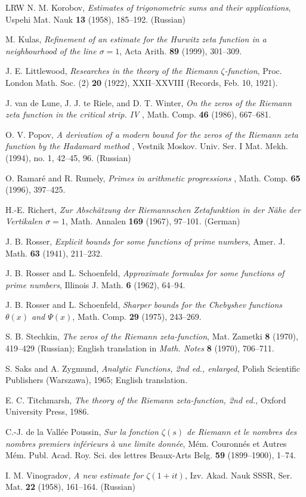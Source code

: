 \documentclass[10pt]{amsart}
\theoremstyle{remark}
\theoremstyle{plain}
\numberwithin{equation}{section}
\theoremstyle{definition}
\begin{document}
\begin{thebibliography}{LRW}
  N. M. Korobov, {\it Estimates of trigonometric sums and 
their applications}, Uspehi Mat. Nauk {\bf 13} (1958),  185--192. (Russian)

  M. Kulas, {\it Refinement of an estimate for the Hurwitz zeta
function in a neighbourhood of the line $\sigma=1$}, Acta Arith. 
{\bf 89} (1999),  301--309.

  J. E. Littlewood, {\it Researches in the theory of the
Riemann $\zeta$-function}, Proc. London Math. Soc. (2) {\bf 20} (1922),
 XXII--XXVIII (Records, Feb. 10, 1921).

  J. van de Lune, J. J. te Riele, and D. T. Winter, {\it
On the zeros of the Riemann zeta function in the critical strip. IV
}, Math. Comp. {\bf 46} (1986),  667--681.

  O. V. Popov, {\it A derivation of a modern bound for the
zeros of the Riemann zeta function by the Hadamard method }, Vestnik 
Moskov. Univ. Ser. I Mat. Mekh.  (1994), no. 1, 42--45, 96.
(Russian)

  O. Ramar\'e and R. Rumely, {\it Primes in arithmetic
progressions }, Math. Comp. {\bf 65} (1996),  397--425. 

  H.-E. Richert, {\it
Zur Absch\"atzung der Riemannschen Zetafunktion in der N\"ahe der Vertikalen
$\sigma=1$}, Math. Annalen {\bf 169} (1967),  97--101. (German)

  J. B. Rosser, {\it Explicit bounds for
some functions of prime numbers}, Amer. J. Math. {\bf 63} (1941), 211--232.

  J. B. Rosser and L. Schoenfeld, {\it Approximate formulas
for some functions of prime numbers}, Illinois J. Math.
{\bf 6} (1962),  64--94. 

  J. B. Rosser and L. Schoenfeld,
 {\it Sharper bounds for the Chebyshev functions
$\theta(x)$ and $\Psi(x)$}, Math. Comp. {\bf 29} (1975),  243--269.

  S. B. Stechkin, {\it The zeros of the Riemann zeta-function},
Mat. Zametki {\bf 8} (1970), 419--429 (Russian); English translation in
{\it Math. Notes} {\bf 8} (1970),  706--711.

  S. Saks and A. Zygmund, {\it Analytic Functions, 2nd ed.,
enlarged}, Polish Scientific Publishers (Warszawa), 1965;
English translation. 

  E. C. Titchmarsh, {\it  The theory of the Riemann 
zeta-function, 2nd ed.}, Oxford University Press, 1986.

  C.-J. de la Vall\'ee Poussin, {\it Sur la fonction $\zeta(s)$
de Riemann et le nombres des nombres premiers inf\'erieurs \`a une limite
donn\'ee}, M\'em. Couronn\'es et Autres M\'em. Publ. Acad. Roy. Sci.
des lettres Beaux-Arts Belg. {\bf 59} (1899--1900), 1--74.

  I. M. Vinogradov, {\it A new estimate for $\zeta(1+it)$},
Izv. Akad. Nauk SSSR, Ser. Mat. {\bf 22} (1958), 161--164. (Russian)

\end{thebibliography} 
\end{document}
